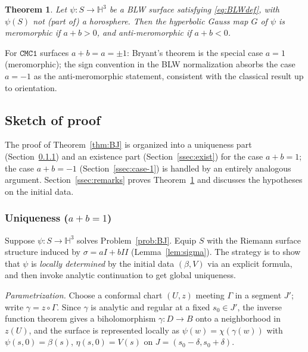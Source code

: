 \documentclass[11pt,a4paper]{article}
\newcommand{\Hyp}{\mathbb{H}^3}                      %
\theoremstyle{plain}
\newtheorem{theorem}{Theorem}
\theoremstyle{definition}
\theoremstyle{remark}
\begin{document}
\begin{theorem}\label{thm:G}
Let $\psi:S\to\Hyp$ be a BLW surface satisfying \eqref{eq:BLWdef}, with
$\psi(S)$ not (part of) a horosphere. Then the hyperbolic Gauss map $G$
of $\psi$ is meromorphic if $a+b>0$, and anti-meromorphic if $a+b<0$.
\end{theorem}

For $\mathtt{CMC1}$ surfaces $a+b=a=\pm1$: Bryant's theorem is the special
case $a=1$ (meromorphic); the sign convention in the BLW normalization
absorbs the case $a=-1$ as the anti-meromorphic statement, consistent
with the classical result up to orientation.

\subsection{Sketch of proof}\label{ssec:proofsketch}

The proof of Theorem~\ref{thm:BJ} is organized into a uniqueness part
(Section~\ref{ssec:uniq}) and an existence part
(Section~\ref{ssec:exist}) for the case $a+b=1$; the case $a+b=-1$
(Section~\ref{ssec:case-1}) is handled by an entirely analogous argument.
Section~\ref{ssec:remarks} proves Theorem~\ref{thm:G} and discusses the
hypotheses on the initial data.

\subsubsection{Uniqueness ($a+b=1$)}\label{ssec:uniq}

Suppose $\psi:S\to\Hyp$ solves Problem~\ref{prob:BJ}. Equip $S$ with the
Riemann surface structure induced by $\sigma=aI+bI\!I$ (Lemma~\ref{lem:sigma}).
The strategy is to show that $\psi$ is \emph{locally determined} by the
initial data $(\beta,V)$ via an explicit formula, and then invoke analytic
continuation to get global uniqueness.

\emph{Parametrization.} Choose a conformal chart $(U,z)$ meeting $\Gamma$
in a segment $J'$; write $\gamma=z\circ\Gamma$. Since $\gamma$ is analytic
and regular at a fixed $s_0\in J'$, the inverse function theorem gives a
biholomorphism $\gamma:D\to B$ onto a neighborhood in $z(U)$, and the
surface is represented locally as $\psi(w)=\chi(\gamma(w))$ with
$\psi(s,0)=\beta(s)$, $\eta(s,0)=V(s)$ on $J=(s_0-\delta,s_0+\delta)$.
\end{document}
